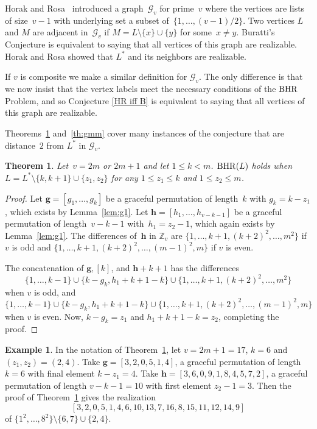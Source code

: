 \documentclass{amsart}
\newtheorem{thm}[prop]{Theorem}
\theoremstyle{definition}
\newtheorem{ex}[prop]{Example}
\numberwithin{equation}{section}
\def\Z{\mathbb{Z}}
\def\BHR{\mathop{\rm BHR}}
\begin{document}
Horak and Rosa~\cite{HR} introduced a graph~$\mathcal{G}_v$ for prime~$v$ where the vertices are lists of size~$v-1$
with underlying set a subset of~$\{ 1, \ldots, (v-1)/2 \}$.  Two vertices $L$ and  $M$ are adjacent in~$\mathcal{G}_v$ if
$M = L \setminus \{ x \} \cup \{y\}$ for some~$x \neq y$.  Buratti's Conjecture is equivalent to saying that all
vertices of this graph are realizable.  Horak and Rosa showed that $L^*$ and its neighbors are realizable.

If $v$ is composite we make a similar definition for $\mathcal{G}_v$.  The only difference is that we now
insist that the vertex labels meet the necessary conditions of the $\BHR$ Problem, and so Conjecture
\ref{HR iff B} is equivalent to saying that all vertices of this graph are realizable.


Theorems~\ref{th:gkh} and~\ref{th:gmm} cover many instances of the conjecture that are distance~$2$ from $L^*$ in $\mathcal{G}_v$.

\begin{thm}\label{th:gkh}
Let~$v = 2m$ or $2m+1$ and let $1 \leq k < m$.
$\BHR(L)$ holds when  $L = L^* \setminus \{k,k+1\}   \cup \{z_1,z_2 \}$ for any $1 \leq z_1 \leq k$ and $1 \leq z_2 \leq m$.
\end{thm}



\begin{proof}
Let $\bm{g} = [g_1, \ldots, g_k]$ be a graceful permutation of length~$k$ with $g_k = k-z_1$, which exists by Lemma~\ref{lem:g1}.
Let $\bm{h} = [h_1, \ldots, h_{v-k-1}]$ be a graceful permutation of length~$v-k-1$ with~$h_1 = z_2-1$, which again exists by
Lemma~\ref{lem:g1}.  The differences of~$\bm{h}$ in $\Z_v$ are
$\{ 1, \ldots, k+1, (k+2)^2, \ldots, m^2 \}$ if $v$ is odd and $\{ 1, \ldots, k+1, (k+2)^2, \ldots, (m-1)^2, m \}$ if $v$ is even.

The concatenation of $\bm{g}, [k]$, and $\bm{h} + k+1$ has the differences
$$ \{ 1, \ldots, k-1 \} \cup \{ k-g_k , h_1+k+1-k  \} \cup \{ 1, \ldots, k+1, (k+2)^2, \ldots, m^2 \} $$
when $v$ is odd, and
$$ \{ 1, \ldots, k-1 \} \cup \{ k-g_k , h_1+k+1-k  \} \cup \{ 1, \ldots, k+1, (k+2)^2, \ldots, (m-1)^2, m \} $$
when $v$ is even.
Now, $k-g_k = z_1$ and $h_1+k+1-k = z_2$, completing the proof.
\end{proof}


\begin{ex}\label{exa:gkh}
In the notation of Theorem~\ref{th:gkh}, let $v = 2m+1 = 17$, $k=6$ and $(z_1,z_2) = (2,4)$.
Take $\bm{g} = [3,2,0,5,1,4]$, a graceful permutation of length $k=6$ with final element $k-z_1 = 4$.
Take $\bm{h} = [3,6,0,9,1,8,4,5,7,2]$, a graceful permutation of length $v-k-1 = 10$ with first element $z_2 - 1 = 3$.
Then the proof of Theorem~\ref{th:gkh} gives the realization
$$[3,2,0,5,1,4,6,10,13,7,16,8,15,11,12,14,9]$$
of $\{ 1^2, \ldots, 8^2 \} \setminus \{6,7\} \cup \{2,4\}$.
\end{ex}
\end{document}
